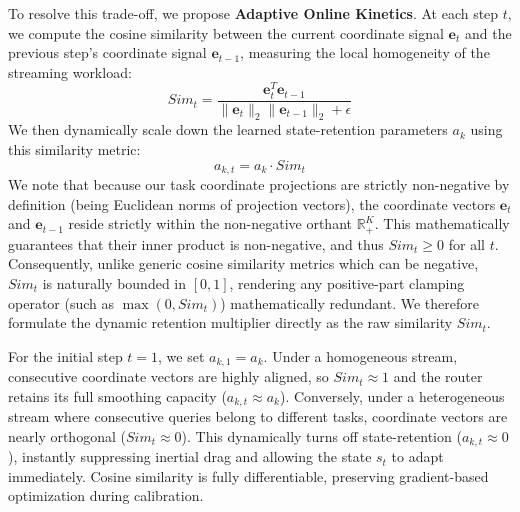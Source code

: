 To resolve this trade-off, we propose \textbf{Adaptive Online Kinetics}. At each step $t$, we compute the cosine similarity between the current coordinate signal $\mathbf{e}_t$ and the previous step's coordinate signal $\mathbf{e}_{t-1}$, measuring the local homogeneity of the streaming workload:
\begin{equation}
    Sim_t = \frac{\mathbf{e}_t^T \mathbf{e}_{t-1}}{\|\mathbf{e}_t\|_2 \|\mathbf{e}_{t-1}\|_2 + \epsilon}
\end{equation}
We then dynamically scale down the learned state-retention parameters $a_k$ using this similarity metric:
\begin{equation}
    a_{k, t} = a_k \cdot Sim_t
\end{equation}
We note that because our task coordinate projections are strictly non-negative by definition (being Euclidean norms of projection vectors), the coordinate vectors $\mathbf{e}_t$ and $\mathbf{e}_{t-1}$ reside strictly within the non-negative orthant $\mathbb{R}_+^K$. This mathematically guarantees that their inner product is non-negative, and thus $Sim_t \ge 0$ for all $t$. Consequently, unlike generic cosine similarity metrics which can be negative, $Sim_t$ is naturally bounded in $[0, 1]$, rendering any positive-part clamping operator (such as $\max(0, Sim_t)$) mathematically redundant. We therefore formulate the dynamic retention multiplier directly as the raw similarity $Sim_t$.

For the initial step $t=1$, we set $a_{k, 1} = a_k$. Under a homogeneous stream, consecutive coordinate vectors are highly aligned, so $Sim_t \approx 1$ and the router retains its full smoothing capacity ($a_{k, t} \approx a_k$). Conversely, under a heterogeneous stream where consecutive queries belong to different tasks, coordinate vectors are nearly orthogonal ($Sim_t \approx 0$). This dynamically turns off state-retention ($a_{k, t} \approx 0$), instantly suppressing inertial drag and allowing the state $s_t$ to adapt immediately. Cosine similarity is fully differentiable, preserving gradient-based optimization during calibration.

